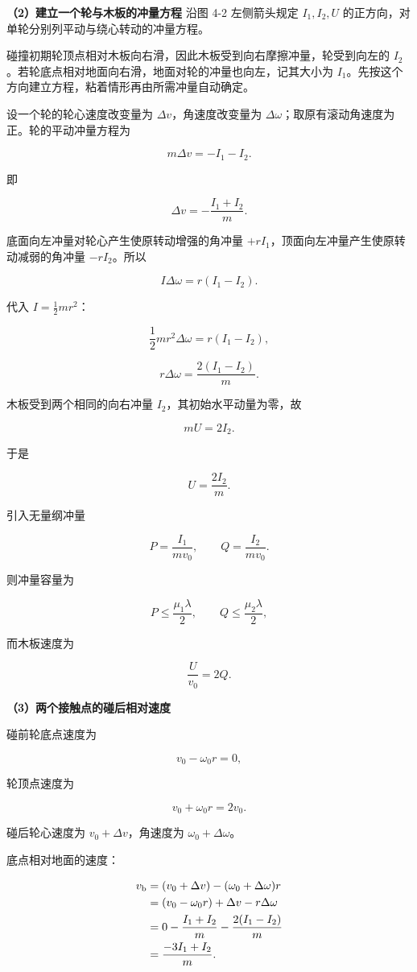 \documentclass[12pt,a4paper,UTF8]{ctexart}
\begin{document}
\textbf{（2）建立一个轮与木板的冲量方程} 沿图 4-2 左侧箭头规定
\(I_1,I_2,U\) 的正方向，对单轮分别列平动与绕心转动的冲量方程。

碰撞初期轮顶点相对木板向右滑，因此木板受到向右摩擦冲量，轮受到向左的
\(I_2\)。若轮底点相对地面向右滑，地面对轮的冲量也向左，记其大小为
\(I_1\)。先按这个方向建立方程，粘着情形再由所需冲量自动确定。

设一个轮的轮心速度改变量为 \(\Delta v\)，角速度改变量为
\(\Delta\omega\)；取原有滚动角速度为正。轮的平动冲量方程为

\[m\Delta v=-I_1-I_2.\]

即

\[\Delta v=-\frac{I_1+I_2}{m}.\]

底面向左冲量对轮心产生使原转动增强的角冲量
\(+rI_1\)，顶面向左冲量产生使原转动减弱的角冲量 \(-rI_2\)。所以

\[I\Delta\omega=r(I_1-I_2).\]

代入 \(I=\frac12mr^2\)：

\[\frac12mr^2\Delta\omega=r(I_1-I_2),\]

\[r\Delta\omega=\frac{2(I_1-I_2)}m.\]

木板受到两个相同的向右冲量 \(I_2\)，其初始水平动量为零，故

\[mU=2I_2.\]

于是

\[\boxed{U=\frac{2I_2}{m}}.\]

引入无量纲冲量

\[P=\frac{I_1}{mv_0},
\qquad
Q=\frac{I_2}{mv_0}.\]

则冲量容量为

\[P\le\frac{\mu_1\lambda}{2},
\qquad
Q\le\frac{\mu_2\lambda}{2},\]

而木板速度为

\[\boxed{\frac U{v_0}=2Q}.\]

\textbf{（3）两个接触点的碰后相对速度}

碰前轮底点速度为

\[v_0-\omega_0r=0,\]

轮顶点速度为

\[v_0+\omega_0r=2v_0.\]

碰后轮心速度为 \(v_0+\Delta v\)，角速度为 \(\omega_0+\Delta\omega\)。

底点相对地面的速度：

\[\begin{aligned}
v_{\rm b}
&=(v_0+\Delta v)-(\omega_0+\Delta\omega)r\\
&=(v_0-\omega_0r)+\Delta v-r\Delta\omega\\
&=0-\frac{I_1+I_2}{m}-\frac{2(I_1-I_2)}m\\
&=\frac{-3I_1+I_2}{m}.
\end{aligned}\]
\end{document}
